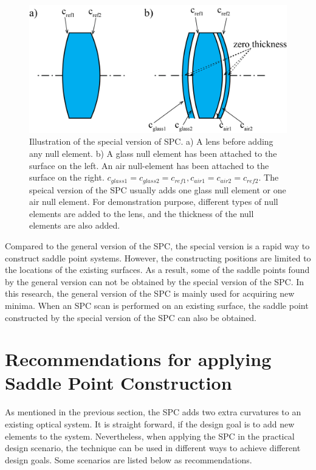 \begin{figure}[h!]
    \centering
    \includegraphics[scale=0.45]{chapter-2/figures/SPCS_illus.png}
    \caption{Illustration of the special version of SPC. a) A lens before adding any null element. b)  A glass null element has been attached to the surface on the left. An air null-element has been attached to the surface on the right. $c_{glass1} = c_{glass2} = c_{ref1}, c_{air1} = c_{air2} = c_{ref2}$. The speical version of the SPC usually adds one glass null element or one air null element. For demonstration purpose, different types of null elements are added to the lens, and the thickness of the null elements are also added.}
    \label{fig:SPCS-illus}
\end{figure}

Compared to the general version of the SPC, the special version is a rapid way to construct saddle point systems. However, the constructing positions are limited to the locations of the existing surfaces. As a result, some of the saddle points found by the general version can not be obtained by the special version of the SPC. In this research, the general version of the SPC is mainly used for acquiring new minima. When an SPC scan is performed on an existing surface, the saddle point constructed by the special version of the SPC can also be obtained. 


\section{Recommendations for applying Saddle Point Construction}\label{section: SPC recommendation}
As mentioned in the previous section, the SPC adds two extra curvatures to an existing optical system. It is straight forward, if the design goal is to add new elements to the system. Nevertheless, when applying the SPC in the practical design scenario, the technique can be used in different ways to achieve different design goals. Some scenarios are listed below as recommendations.

